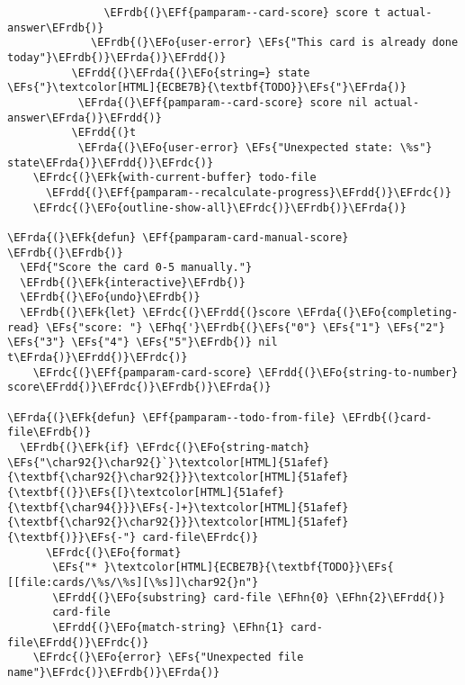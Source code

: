 \documentclass[a4wide,10pt]{article}
\newcommand{\EFs}[1]{\textcolor{EFs}{#1}} %
\newcommand{\EFd}[1]{\textcolor{EFd}{#1}} %
\newcommand{\EFk}[1]{\textcolor{EFk}{#1}} %
\newcommand{\EFf}[1]{\textcolor{EFf}{#1}} %
\newcommand{\EFo}[1]{\textcolor{EFo}{#1}} %
\newcommand{\EFhn}[1]{\textcolor{EFhn}{\textbf{#1}}} %
\newcommand{\EFhq}[1]{\textcolor{EFhq}{#1}} %
\newcommand{\EFrda}[1]{\textcolor{EFrda}{#1}} %
\newcommand{\EFrdb}[1]{\textcolor{EFrdb}{#1}} %
\newcommand{\EFrdc}[1]{\textcolor{EFrdc}{#1}} %
\newcommand{\EFrdd}[1]{\textcolor{EFrdd}{#1}} %
\begin{document}
\begin{Code}
\begin{Verbatim}
               \EFrdb{(}\EFf{pamparam--card-score} score t actual-answer\EFrdb{)}
             \EFrdb{(}\EFo{user-error} \EFs{"This card is already done today"}\EFrdb{)}\EFrda{)}\EFrdd{)}
          \EFrdd{(}\EFrda{(}\EFo{string=} state \EFs{"}\textcolor[HTML]{ECBE7B}{\textbf{TODO}}\EFs{"}\EFrda{)}
           \EFrda{(}\EFf{pamparam--card-score} score nil actual-answer\EFrda{)}\EFrdd{)}
          \EFrdd{(}t
           \EFrda{(}\EFo{user-error} \EFs{"Unexpected state: \%s"} state\EFrda{)}\EFrdd{)}\EFrdc{)}
    \EFrdc{(}\EFk{with-current-buffer} todo-file
      \EFrdd{(}\EFf{pamparam--recalculate-progress}\EFrdd{)}\EFrdc{)}
    \EFrdc{(}\EFo{outline-show-all}\EFrdc{)}\EFrdb{)}\EFrda{)}

\EFrda{(}\EFk{defun} \EFf{pamparam-card-manual-score} \EFrdb{(}\EFrdb{)}
  \EFd{"Score the card 0-5 manually."}
  \EFrdb{(}\EFk{interactive}\EFrdb{)}
  \EFrdb{(}\EFo{undo}\EFrdb{)}
  \EFrdb{(}\EFk{let} \EFrdc{(}\EFrdd{(}score \EFrda{(}\EFo{completing-read} \EFs{"score: "} \EFhq{'}\EFrdb{(}\EFs{"0"} \EFs{"1"} \EFs{"2"} \EFs{"3"} \EFs{"4"} \EFs{"5"}\EFrdb{)} nil t\EFrda{)}\EFrdd{)}\EFrdc{)}
    \EFrdc{(}\EFf{pamparam-card-score} \EFrdd{(}\EFo{string-to-number} score\EFrdd{)}\EFrdc{)}\EFrdb{)}\EFrda{)}

\EFrda{(}\EFk{defun} \EFf{pamparam--todo-from-file} \EFrdb{(}card-file\EFrdb{)}
  \EFrdb{(}\EFk{if} \EFrdc{(}\EFo{string-match} \EFs{"\char92{}\char92{}`}\textcolor[HTML]{51afef}{\textbf{\char92{}\char92{}}}\textcolor[HTML]{51afef}{\textbf{(}}\EFs{[}\textcolor[HTML]{51afef}{\textbf{\char94{}}}\EFs{-]+}\textcolor[HTML]{51afef}{\textbf{\char92{}\char92{}}}\textcolor[HTML]{51afef}{\textbf{)}}\EFs{-"} card-file\EFrdc{)}
      \EFrdc{(}\EFo{format}
       \EFs{"* }\textcolor[HTML]{ECBE7B}{\textbf{TODO}}\EFs{ [[file:cards/\%s/\%s][\%s]]\char92{}n"}
       \EFrdd{(}\EFo{substring} card-file \EFhn{0} \EFhn{2}\EFrdd{)}
       card-file
       \EFrdd{(}\EFo{match-string} \EFhn{1} card-file\EFrdd{)}\EFrdc{)}
    \EFrdc{(}\EFo{error} \EFs{"Unexpected file name"}\EFrdc{)}\EFrdb{)}\EFrda{)}


\end{Verbatim}
\end{Code}
\end{document}
